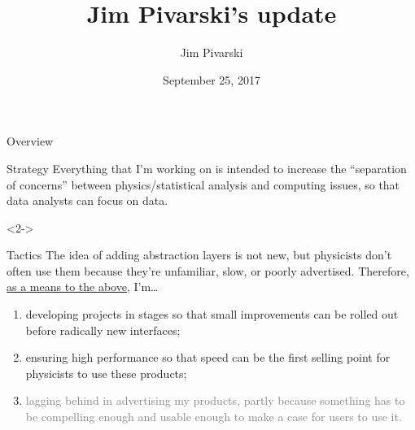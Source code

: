 \documentclass{beamer}
\title[2017-09-25-dianahep-update]{Jim Pivarski's update}
\author{Jim Pivarski}
\institute{Princeton University -- DIANA}
\date{September 25, 2017}
\begin{document}

\begin{frame}
  \titlepage
\end{frame}




\begin{frame}{Overview}
\vspace{0.25 cm}
\begin{block}{Strategy}
Everything that I'm working on is intended to increase the ``separation of concerns'' between physics/statistical analysis and computing issues, so that data analysts can focus on data.
\end{block}

\begin{uncoverenv}<2->
\begin{block}{Tactics}
The idea of adding abstraction layers is not new, but physicists don't often use them because they're unfamiliar, slow, or poorly advertised. Therefore, \underline{as a means to the above}, I'm\ldots
\begin{enumerate}
\item<3-> developing projects in stages so that small improvements can be rolled out before radically new interfaces;
\item<4-> ensuring high performance so that speed can be the first selling point for physicists to use these products;
\item<5-> \textcolor{gray}{lagging behind in advertising my products, partly because something has to be compelling enough and usable enough to make a case for users to use it.}
\end{enumerate}
\end{block}
\end{uncoverenv}
\end{frame}
\end{document}
